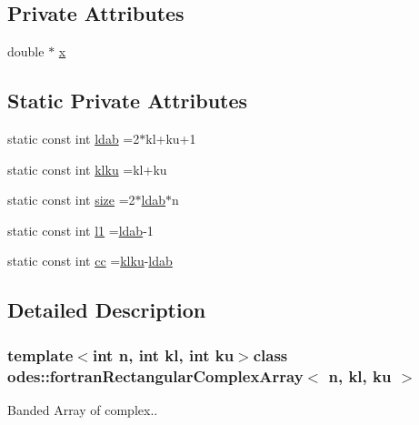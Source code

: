 \subsection*{Private Attributes}
\begin{DoxyCompactItemize}
\item 
double $\ast$ \hyperlink{classodes_1_1fortranRectangularComplexArray_a04409d9c6123c7ab97b2c9599ddec0cd}{x}
\end{DoxyCompactItemize}
\subsection*{Static Private Attributes}
\begin{DoxyCompactItemize}
\item 
static const int \hyperlink{classodes_1_1fortranRectangularComplexArray_a44b92ded1ed0bf332322a6f4ed439db5}{ldab} =2$\ast$kl+ku+1
\item 
static const int \hyperlink{classodes_1_1fortranRectangularComplexArray_a0ec73fecad411a352df4b99c247780ca}{klku} =kl+ku
\item 
static const int \hyperlink{classodes_1_1fortranRectangularComplexArray_a92dd60f10c597b14d4a38502ab291cba}{size} =2$\ast$\hyperlink{classodes_1_1fortranRectangularComplexArray_a44b92ded1ed0bf332322a6f4ed439db5}{ldab}$\ast$n
\item 
static const int \hyperlink{classodes_1_1fortranRectangularComplexArray_a0b1f7b8193f5ee24cfde0c6953aee714}{l1} =\hyperlink{classodes_1_1fortranRectangularComplexArray_a44b92ded1ed0bf332322a6f4ed439db5}{ldab}-\/1
\item 
static const int \hyperlink{classodes_1_1fortranRectangularComplexArray_a527c968c7a1db51e34a8c5a1c65192fb}{cc} =\hyperlink{classodes_1_1fortranRectangularComplexArray_a0ec73fecad411a352df4b99c247780ca}{klku}-\/\hyperlink{classodes_1_1fortranRectangularComplexArray_a44b92ded1ed0bf332322a6f4ed439db5}{ldab}
\end{DoxyCompactItemize}


\subsection{Detailed Description}
\subsubsection*{template$<$int n, int kl, int ku$>$class odes\-::fortran\-Rectangular\-Complex\-Array$<$ n, kl, ku $>$}

Banded Array of complex.. 


